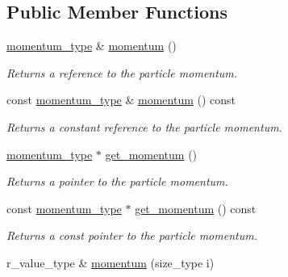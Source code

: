\subsection*{Public Member Functions}
\begin{DoxyCompactItemize}
\item 
\hypertarget{a00019_a79fce0d9b6a930abadadf0821af97a10}{}\hyperlink{a00579}{momentum\+\_\+type} \& \hyperlink{a00019_a79fce0d9b6a930abadadf0821af97a10}{momentum} ()\label{a00019_a79fce0d9b6a930abadadf0821af97a10}

\begin{DoxyCompactList}\small\item\em Returns a reference to the particle momentum. \end{DoxyCompactList}\item 
\hypertarget{a00019_a1596ed0e9ea2b008e1a80848ff502031}{}const \hyperlink{a00579}{momentum\+\_\+type} \& \hyperlink{a00019_a1596ed0e9ea2b008e1a80848ff502031}{momentum} () const \label{a00019_a1596ed0e9ea2b008e1a80848ff502031}

\begin{DoxyCompactList}\small\item\em Returns a constant reference to the particle momentum. \end{DoxyCompactList}\item 
\hypertarget{a00019_a981db240e25874134f68b5ff29acd70f}{}\hyperlink{a00579}{momentum\+\_\+type} $\ast$ \hyperlink{a00019_a981db240e25874134f68b5ff29acd70f}{get\+\_\+momentum} ()\label{a00019_a981db240e25874134f68b5ff29acd70f}

\begin{DoxyCompactList}\small\item\em Returns a pointer to the particle momentum. \end{DoxyCompactList}\item 
\hypertarget{a00019_a3c45bdcb543f3465beb61a24b5d6adc7}{}const \hyperlink{a00579}{momentum\+\_\+type} $\ast$ \hyperlink{a00019_a3c45bdcb543f3465beb61a24b5d6adc7}{get\+\_\+momentum} () const \label{a00019_a3c45bdcb543f3465beb61a24b5d6adc7}

\begin{DoxyCompactList}\small\item\em Returns a const pointer to the particle momentum. \end{DoxyCompactList}\item 
\hypertarget{a00019_a0e6e8593189c78c16b413fd8ba892c20}{}r\+\_\+value\+\_\+type \& \hyperlink{a00019_a0e6e8593189c78c16b413fd8ba892c20}{momentum} (size\+\_\+type i)\label{a00019_a0e6e8593189c78c16b413fd8ba892c20}


\end{DoxyCompactItemize}
